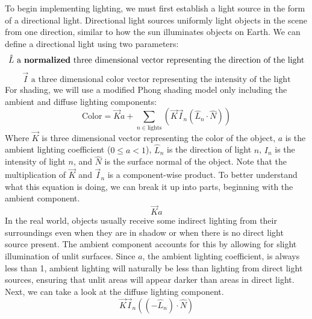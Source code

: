 To begin implementing lighting, we must first establish a light source in the form of a directional light. Directional light sources uniformly light objects in the scene from one direction, similar to how the sun illuminates objects on Earth. We can define a directional light using two parameters:
$$ \hat{L} \text{ a \textbf{normalized} three dimensional vector representing the direction of the light}$$
$$ \Vec{I} \text{ a three dimensional color vector representing the intensity of the light}$$
For shading, we will use a modified Phong shading model only including the ambient and diffuse lighting components:
$$
\text{Color} = \Vec{K}a + \sum_{n \in \text{lights}}(\Vec{K}\Vec{I}_{n}(\hat{L}_{n} \cdot \hat{N}))
$$
Where $\Vec{K}$ is three dimensional vector representing the color of the object, $a$ is the ambient lighting coefficient ($0 \leq a < 1$), $\hat{L}_n$ is the direction of light $n$, $I_n$ is the intensity of light $n$, and $\hat{N}$ is the surface normal of the object. Note that the multiplication of $\Vec{K}$ and $\Vec{I}_n$ is a component-wise product. To better understand what this equation is doing, we can break it up into parts, beginning with the ambient component.
$$\Vec{K}a$$
In the real world, objects usually receive some indirect lighting from their surroundings even when they are in shadow or when there is no direct light source present. The ambient component accounts for this by allowing for slight illumination of unlit surfaces. Since $a$, the ambient lighting coefficient, is always less than 1, ambient lighting will naturally be less than lighting from direct light sources, ensuring that unlit areas will appear darker than areas in direct light. Next, we can take a look at the diffuse lighting component.
$$\Vec{K}\Vec{I}_{n}((-\hat{L}_{n}) \cdot \hat{N})$$
